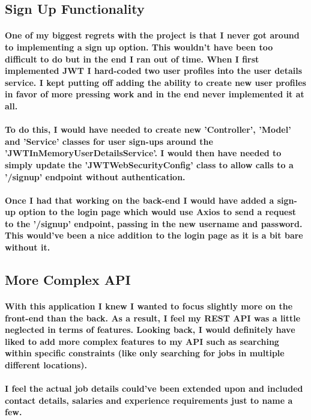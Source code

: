 \subsection{Sign Up Functionality}
\paragraph{One of my biggest regrets with the project is that I never got around to implementing a sign up option. This wouldn't have been too difficult to do but in the end I ran out of time. When I first implemented JWT I hard-coded two user profiles into the user details service. I kept putting off adding the ability to create new user profiles in favor of more pressing work and in the end never implemented it at all.}
\paragraph{To do this, I would have needed to create new 'Controller', 'Model' and 'Service' classes for user sign-ups around the 'JWTInMemoryUserDetailsService'. I would then have needed to simply update the 'JWTWebSecurityConfig' class to allow calls to a '/signup' endpoint without authentication.}
\paragraph{Once I had that working on the back-end I would have added a sign-up option to the login page which would use Axios to send a request to the '/signup' endpoint, passing in the new username and password. This would've been a nice addition to the login page as it is a bit bare without it.}

\subsection{More Complex API}
\paragraph{With this application I knew I wanted to focus slightly more on the front-end than the back. As a result, I feel my REST API was a little neglected in terms of features. Looking back, I would definitely have liked to add more complex features to my API such as searching within specific constraints (like only searching for jobs in multiple different locations).}
\paragraph{I feel the actual job details could've been extended upon and included contact details, salaries and experience requirements just to name a few.}
